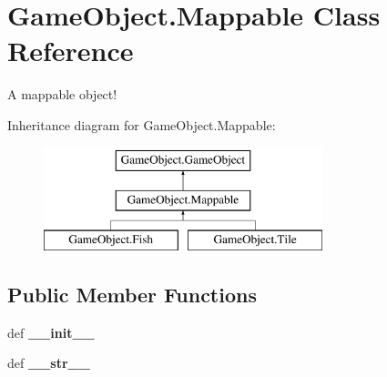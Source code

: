\hypertarget{classGameObject_1_1Mappable}{\section{\-Game\-Object.\-Mappable \-Class \-Reference}
\label{classGameObject_1_1Mappable}
}


\-A mappable object!  


\-Inheritance diagram for \-Game\-Object.\-Mappable\-:\begin{figure}[H]
\begin{center}
\leavevmode
\includegraphics[height=3.000000cm]{classGameObject_1_1Mappable}
\end{center}
\end{figure}
\subsection*{\-Public \-Member \-Functions}
\begin{DoxyCompactItemize}
\item 
\hypertarget{classGameObject_1_1Mappable_aefa60dae2a17f280664e616bbcb0fe3d}{def {\bfseries \-\_\-\-\_\-init\-\_\-\-\_\-}}\label{classGameObject_1_1Mappable_aefa60dae2a17f280664e616bbcb0fe3d}

\item 
\hypertarget{classGameObject_1_1Mappable_a15b4a1d5f313faaaa9822d3432ea361e}{def {\bfseries \-\_\-\-\_\-str\-\_\-\-\_\-}}\label{classGameObject_1_1Mappable_a15b4a1d5f313faaaa9822d3432ea361e}

\end{DoxyCompactItemize}
